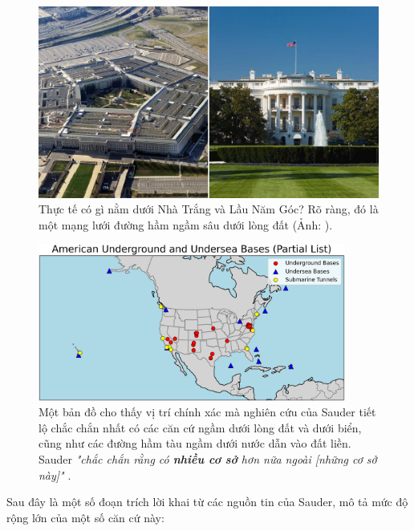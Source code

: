 \documentclass[10pt,twocolumn,letterpaper]{article}
\begin{document}
\begin{figure}[b]
\begin{center}
   \includegraphics[width=1\linewidth]{penta.jpg}
\end{center}
   \caption{Thực tế có gì nằm dưới Nhà Trắng và Lầu Năm Góc? Rõ ràng, đó là một mạng lưới đường hầm ngầm sâu dưới lòng đất (Ảnh: \cite{31}).}
\label{fig:3}
\label{fig:onecol}
\end{figure}
\begin{figure}[t]
\begin{center}
\includegraphics[width=0.9\textwidth]{basescrop.png}
\end{center}
   \caption{Một bản đồ cho thấy vị trí chính xác mà nghiên cứu của Sauder tiết lộ chắc chắn nhất có các căn cứ ngầm dưới lòng đất và dưới biển, cũng như các đường hầm tàu ngầm dưới nước dẫn vào đất liền. Sauder \textit{"chắc chắn rằng có \textbf{nhiều cơ sở} hơn nữa ngoài [những cơ sở này]"} \cite{22}.}
   \label{fig:4}
\end{figure}

Sau đây là một số đoạn trích lời khai từ các nguồn tin của Sauder, mô tả mức độ rộng lớn của một số căn cứ này:
\end{document}
